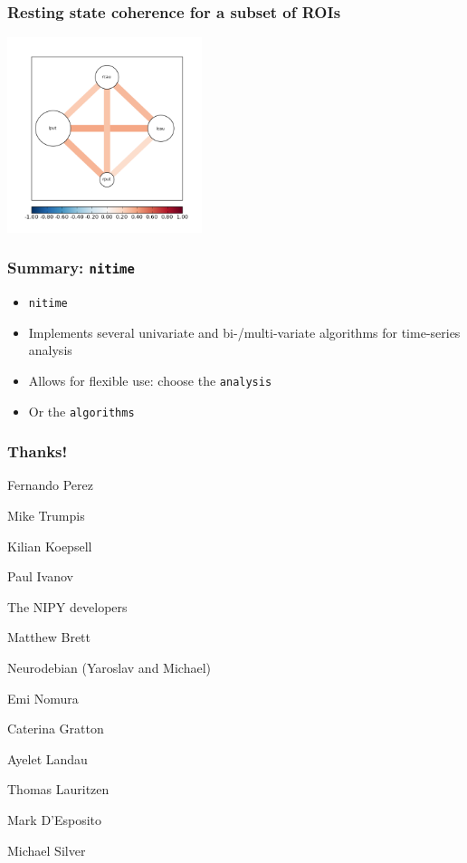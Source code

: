 \documentclass{beamer}
\begin{document}
\begin{frame}
\frametitle{Resting state coherence for a subset of ROIs}
\includegraphics[height=5.7cm]{figures/resting_state_fmri_04}
\end{frame}


\begin{frame}
\frametitle{Summary: \tt{nitime}}
\begin{itemize}
\pause
\item
\tt{nitime} 
\pause
\item
Implements several univariate and bi-/multi-variate algorithms for time-series
analysis 
\pause
\item
Allows for flexible use: choose the \tt{analysis} 
\pause
\item
Or the \tt{algorithms} 

\end{itemize}
\end{frame}

\begin{frame}
\frametitle{Thanks!}
\pause
Fernando Perez

Mike Trumpis

Kilian Koepsell

Paul Ivanov

\pause
The NIPY developers

Matthew Brett 

\pause
Neurodebian (Yaroslav and Michael)

\pause
Emi Nomura 

Caterina Gratton 

Ayelet Landau 

Thomas Lauritzen

\pause
Mark D'Esposito 

Michael Silver
\end{frame}
\end{document}
